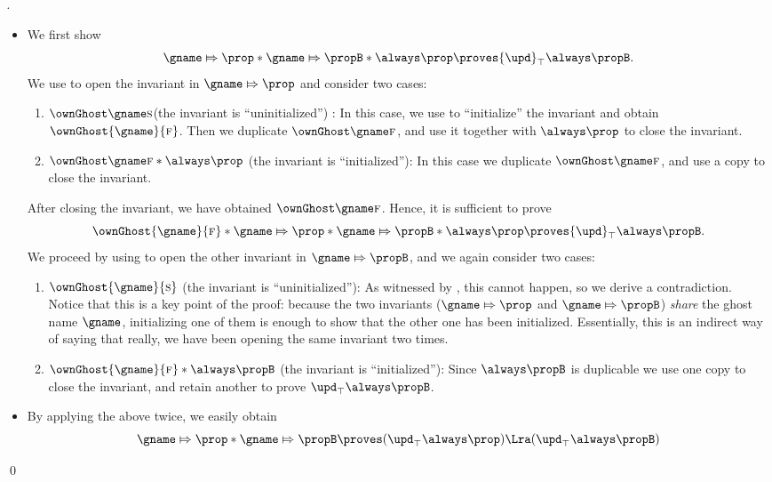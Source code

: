 \begin{proof}[]
\begin{itemize}
  \item We first show
    \[\gname \Mapsto \prop * \gname \Mapsto \propB * \always \prop \proves {\upd}_\top \always \propB.\]
    We use  to open the invariant in $\gname \Mapsto \prop$ and consider two cases:
    \begin{enumerate}
    \item $\ownGhost \gname \starttoken$(the invariant is ``uninitialized'') : In this case, we use  to ``initialize'' the invariant and obtain $\ownGhost{\gname}{\finishtoken}$.
      Then we duplicate $\ownGhost \gname \finishtoken$, and use it together with $\always \prop$ to close the invariant.
    \item $\ownGhost \gname \finishtoken * \always \prop$ (the invariant is ``initialized''): In this case we duplicate $\ownGhost \gname \finishtoken$, and use a copy to close the invariant.
    \end{enumerate}
    After closing the invariant, we have obtained $\ownGhost \gname \finishtoken$.
    Hence, it is sufficient to prove
    \[
      \ownGhost{\gname}{\finishtoken} * \gname \Mapsto \prop * \gname \Mapsto \propB * \always \prop \proves {\upd}_\top \always \propB.\]
    We proceed by using  to open the other invariant in $\gname \Mapsto \propB$, and we again consider two cases:
    \begin{enumerate}
    \item $\ownGhost{\gname}{\starttoken}$ (the invariant is ``uninitialized''): As witnessed by , this cannot happen, so we derive a contradiction.
      Notice that this is a key point of the proof: because the two invariants ($\gname \Mapsto \prop$ and $\gname \Mapsto \propB$) \emph{share} the ghost name $\gname$, initializing one of them is enough to show that the other one has been initialized.
      Essentially, this is an indirect way of saying that really, we have been opening the same invariant two times.
    \item $\ownGhost{\gname}{\finishtoken} * \always \propB$ (the invariant is ``initialized''):
      Since $\always \propB$ is duplicable we use one copy to close the invariant, and retain another to prove ${\upd}_\top \always \propB$.
    \end{enumerate}
\item By applying the above twice, we easily obtain
\[ \gname \Mapsto \prop * \gname \Mapsto \propB \proves ({\upd}_\top \always \prop) \Lra ({\upd}_\top \always \propB) \]
\end{itemize}
\qed \end{proof}
